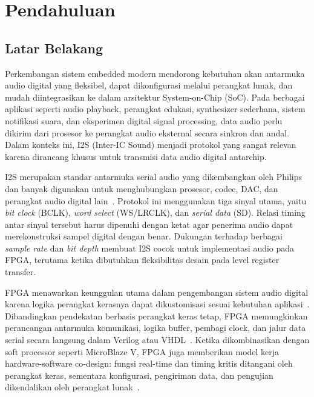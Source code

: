 \chapter{Pendahuluan}

\section{Latar Belakang}

\hspace{1cm}Perkembangan sistem embedded modern mendorong kebutuhan akan antarmuka audio digital yang fleksibel, dapat dikonfigurasi melalui perangkat lunak, dan mudah diintegrasikan ke dalam arsitektur System-on-Chip (SoC). Pada berbagai aplikasi seperti audio playback, perangkat edukasi, synthesizer sederhana, sistem notifikasi suara, dan eksperimen digital signal processing, data audio perlu dikirim dari prosesor ke perangkat audio eksternal secara sinkron dan andal. Dalam konteks ini, I2S (Inter-IC Sound) menjadi protokol yang sangat relevan karena dirancang khusus untuk transmisi data audio digital antarchip.

\hspace{1cm}I2S merupakan standar antarmuka serial audio yang dikembangkan oleh Philips dan banyak digunakan untuk menghubungkan prosesor, codec, DAC, dan perangkat audio digital lain~\citep{philips_i2s_1986}. Protokol ini menggunakan tiga sinyal utama, yaitu \textit{bit clock} (BCLK), \textit{word select} (WS/LRCLK), dan \textit{serial data} (SD). Relasi timing antar sinyal tersebut harus dipenuhi dengan ketat agar penerima audio dapat merekonstruksi sampel digital dengan benar. Dukungan terhadap berbagai \textit{sample rate} dan \textit{bit depth} membuat I2S cocok untuk implementasi audio pada FPGA, terutama ketika dibutuhkan fleksibilitas desain pada level register transfer.

\hspace{1cm}FPGA menawarkan keunggulan utama dalam pengembangan sistem audio digital karena logika perangkat kerasnya dapat dikustomisasi sesuai kebutuhan aplikasi~\citep{trimberger_history_fpga_2018}. Dibandingkan pendekatan berbasis perangkat keras tetap, FPGA memungkinkan perancangan antarmuka komunikasi, logika buffer, pembagi clock, dan jalur data serial secara langsung dalam Verilog atau VHDL~\citep{palnitkar_verilog_2003}. Ketika dikombinasikan dengan soft processor seperti MicroBlaze V, FPGA juga memberikan model kerja hardware-software co-design: fungsi real-time dan timing kritis ditangani oleh perangkat keras, sementara konfigurasi, pengiriman data, dan pengujian dikendalikan oleh perangkat lunak~\citep{crockett_zynq_book_2014}.

